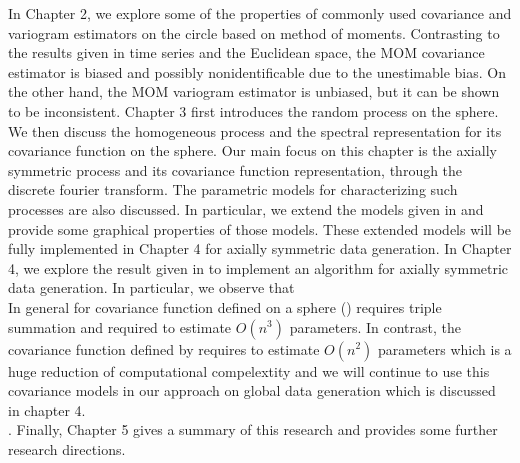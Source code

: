 In Chapter 2, we explore some of the properties of commonly used covariance and variogram estimators on the circle based on method of moments. Contrasting to the results given in time series and the Euclidean space, the MOM covariance estimator is biased and possibly nonidentificable due to the unestimable bias. On the other hand, the MOM variogram estimator is unbiased, but it can be shown to be inconsistent. Chapter 3 first introduces the random process on the sphere. We then discuss the homogeneous process and the spectral representation for its covariance function on the sphere. Our main focus on this chapter is the axially symmetric process and its covariance function representation, through the discrete fourier transform. The parametric models for characterizing such processes are also discussed. In particular, we extend the models given in \cite{Huang2012} and provide some graphical properties of those models. These extended models will be fully implemented in Chapter 4 for axially symmetric data generation. In Chapter 4, we explore the result given in \cite{Huang2012} to implement an algorithm for axially symmetric data generation. In particular, we observe that \\

		In general for covariance function defined on a sphere (\cite{Stein2007}) requires triple summation and required to estimate $O(n^3)$ parameters. In contrast, the covariance function  defined by \cite{Huang2012} requires to estimate $O(n^2)$ parameters which is a huge reduction of computational compelextity and we will continue to use this covariance models in our approach on global data generation which is discussed in chapter 4.\\
		
. Finally, Chapter 5 gives a summary of this research and provides some further research directions.   




%
%
%
%			
%			
%			
%			
%			
%			
%			
%			
%			
%			
%			
%			
%
